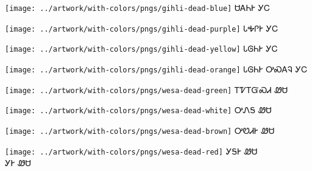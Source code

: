 \documentclass[avery5371]{flashcards}%
\begin{document}
    \begin{flashcard}{
        \texttt{[image: ../artwork/with-colors/pngs/gihli-dead-blue]}
    }
        \Huge ᏌᎪᏂᎨ ᎩᏟ
    \end{flashcard}

    \begin{flashcard}{
        \texttt{[image: ../artwork/with-colors/pngs/gihli-dead-purple]}
    }
        \Huge ᏓᎭᎵᎨ ᎩᏟ
    \end{flashcard}

    \begin{flashcard}{
        \texttt{[image: ../artwork/with-colors/pngs/gihli-dead-yellow]}
    }
        \Huge ᏓᎶᏂᎨ ᎩᏟ
    \end{flashcard}

    \begin{flashcard}{
        \texttt{[image: ../artwork/with-colors/pngs/gihli-dead-orange]}
    }
        \Huge ᏓᎶᏂᎨ ᎤᏍᎪᎸ ᎩᏟ
    \end{flashcard}

    \begin{flashcard}{
        \texttt{[image: ../artwork/with-colors/pngs/wesa-dead-green]}
    }
        \Huge ᎢᏤᎢᏳᏍᏗ ᏪᏌ
    \end{flashcard}

    \begin{flashcard}{
        \texttt{[image: ../artwork/with-colors/pngs/wesa-dead-white]}
    }
        \Huge ᎤᏁᎦ ᏪᏌ
    \end{flashcard}

    \begin{flashcard}{
        \texttt{[image: ../artwork/with-colors/pngs/wesa-dead-brown]}
    }
        \Huge ᎤᏬᏗᎨ ᏪᏌ
    \end{flashcard}

    \begin{flashcard}{
        \texttt{[image: ../artwork/with-colors/pngs/wesa-dead-red]}
    }
        \Huge ᎩᎦᎨ ᏪᏌ\\ᎩᎨ ᏪᏌ
    \end{flashcard}
\end{document}

